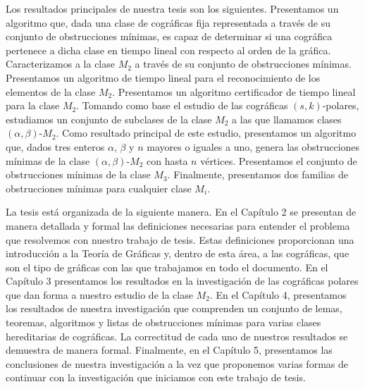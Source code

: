 Los resultados principales de nuestra tesis son los siguientes. Presentamos un algoritmo que, dada una clase de cográficas fija representada a través de su conjunto de obstrucciones mínimas, es capaz de determinar si una cográfica pertenece a dicha clase en tiempo lineal con respecto al orden de la gráfica. Caracterizamos a la clase $M_2$ a través de su conjunto de obstrucciones mínimas. Presentamos un algoritmo de tiempo lineal para el reconocimiento de los elementos de la clase $M_2$. Presentamos un algoritmo certificador de tiempo lineal para la clase $M_2$. Tomando como base el estudio de las cográficas $(s,k)$-polares, estudiamos un conjunto de subclases de la clase $M_2$ a las que llamamos clases $(\alpha,\beta)$-$M_2$. Como resultado principal de este estudio, presentamos un algoritmo que, dados tres enteros $\alpha$, $\beta$ y $n$ mayores o iguales a uno, genera las obstrucciones mínimas de la clase $(\alpha,\beta)$-$M_2$ con hasta $n$ vértices. Presentamos el conjunto de obstrucciones mínimas de la clase $M_3$. Finalmente, presentamos dos familias de obstrucciones mínimas para cualquier clase $M_i$.

La tesis está organizada de la siguiente manera. En el Capítulo 2 se presentan de manera detallada y formal las definiciones necesarias para entender el problema que resolvemos con nuestro trabajo de tesis. Estas definiciones proporcionan una introducción a la Teoría de Gráficas y, dentro de esta área, a las cográficas, que son el tipo de gráficas con las que trabajamos en todo el documento. En el Capítulo 3 presentamos los resultados en la investigación de las cográficas polares que dan forma a nuestro estudio de la clase $M_2$. En el Capítulo 4, presentamos los resultados de nuestra investigación que comprenden un conjunto de lemas, teoremas, algoritmos y listas de obstrucciones mínimas para varias clases hereditarias de cográficas. La correctitud de cada uno de nuestros resultados se demuestra de manera formal. Finalmente, en el Capítulo 5, presentamos las conclusiones de nuestra investigación a la vez que proponemos varias formas de continuar con la investigación que iniciamos con este trabajo de tesis. 